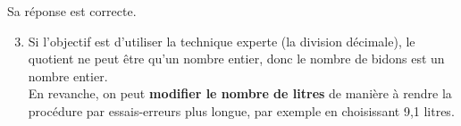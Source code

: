       Sa réponse est correcte. \\
\begin{enumerate}
\setcounter{enumi}{2}
   \item Si l'objectif est d'utiliser la technique experte (la division décimale), le quotient ne peut être qu'un nombre entier, donc le nombre de bidons est un nombre entier. \\
   En revanche, on peut \textbf{modifier le nombre de litres} de manière à rendre la procédure par essais-erreurs plus longue, par exemple en choisissant 9,1 litres.
\end{enumerate}
